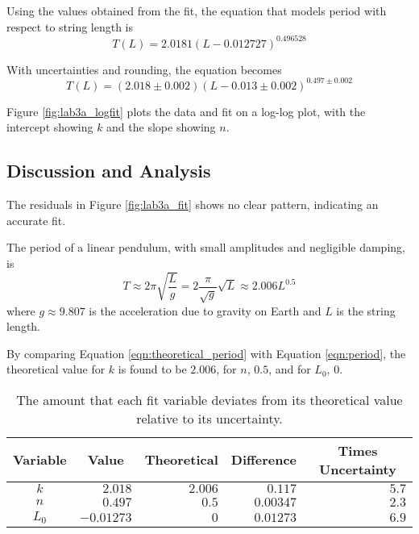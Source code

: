 \documentclass[aps,twocolumn,secnumarabic,nobalancelastpage,amsmath,amssymb,nofootinbib,floatfix,letterpaper]{revtex4}
\begin{document}
Using the values obtained from the fit, the equation that models period with respect to string length is
\begin{equation}
    T(L) = 2.0181(L - 0.012727)^{0.496528}
    \label{eqn:actual_period}
\end{equation}

With uncertainties and rounding, the equation becomes
\begin{equation}
    T(L) = (2.018 \pm 0.002)(L - 0.013 \pm 0.002)^{0.497 \pm 0.002}
\end{equation}

Figure \ref{fig:lab3a_logfit} plots the data and fit on a log-log plot, with the intercept showing \(k\) and the slope
showing \(n\).

\subsection{Discussion and Analysis}
\label{sec:lab3a_analysis}

The residuals in Figure \ref{fig:lab3a_fit} shows no clear pattern, indicating an accurate fit.

The period of a linear pendulum, with small amplitudes and negligible damping, is \cite{period}
\begin{equation}
    T \approx 2\pi\sqrt{\frac{L}{g}} = 2\frac{\pi}{\sqrt{g}}\sqrt{L} \approx 2.006L^{0.5}
    \label{eqn:theoretical_period}
\end{equation}
where \(g \approx 9.807\) is the acceleration due to gravity on Earth and \(L\) is the string length.

By comparing Equation \ref{eqn:theoretical_period} with Equation \ref{eqn:period}, the theoretical value for \(k\) is found to be
\(2.006\), for \(n\), \(0.5\), and for \(L_0\), \(0\).

\begin{table}[ht]
    \begin{tabular}{c|r|r|r|r}
        Variable & \multicolumn{1}{c|}{Value} & \multicolumn{1}{c|}{Theoretical} & \multicolumn{1}{c|}{Difference} & \multicolumn{1}{c}{Times Uncertainty} \\
        \hline
        \(k\) & \(2.018\) & \(2.006\) & \(0.117\) & \(5.7\) \\
        \(n\) & \(0.497\) & \(0.5\) & \(0.00347\) & \(2.3\) \\
        \(L_0\) & \(-0.01273\) & \(0\) & \(0.01273\) & \(6.9\) \\
    \end{tabular}
    \caption{The amount that each fit variable deviates from its theoretical value relative to its uncertainty.}
    \label{table:lab3a_deviations}
\end{table}
\end{document}
